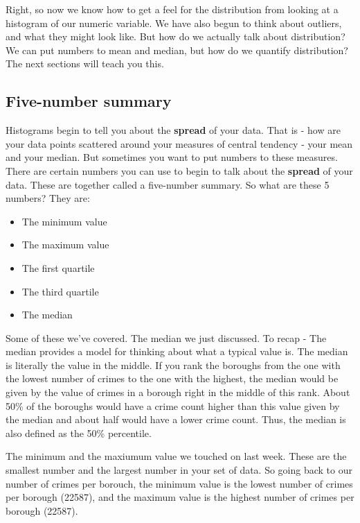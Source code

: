\documentclass[]{book}
\providecommand{\tightlist}{%
  \setlength{\itemsep}{0pt}\setlength{\parskip}{0pt}}
\theoremstyle{definition}
\theoremstyle{definition}
\theoremstyle{definition}
\theoremstyle{remark}
\begin{document}
Right, so now we know how to get a feel for the distribution from
looking at a histogram of our numeric variable. We have also begun to
think about outliers, and what they might look like. But how do we
actually talk about distribution? We can put numbers to mean and median,
but how do we quantify distribution? The next sections will teach you
this.

\hypertarget{five-number-summary}{%
\subsection{Five-number summary}\label{five-number-summary}}

Histograms begin to tell you about the \textbf{spread} of your data.
That is - how are your data points scattered around your measures of
central tendency - your mean and your median. But sometimes you want to
put numbers to these measures. There are certain numbers you can use to
begin to talk about the \textbf{spread} of your data. These are together
called a five-number summary. So what are these 5 numbers? They are:

\begin{itemize}
\tightlist
\item
  The minimum value
\item
  The maximum value
\item
  The first quartile
\item
  The third quartile
\item
  The median
\end{itemize}

Some of these we've covered. The median we just discussed. To recap -
The median provides a model for thinking about what a typical value is.
The median is literally the value in the middle. If you rank the
boroughs from the one with the lowest number of crimes to the one with
the highest, the median would be given by the value of crimes in a
borough right in the middle of this rank. About 50\% of the boroughs
would have a crime count higher than this value given by the median and
about half would have a lower crime count. Thus, the median is also
defined as the 50\% percentile.

The minimum and the maxiumum value we touched on last week. These are
the smallest number and the largest number in your set of data. So going
back to our number of crimes per borouch, the minimum value is the
lowest number of crimes per borough (22587), and the maximum value is
the highest number of crimes per borough (22587).
\end{document}
